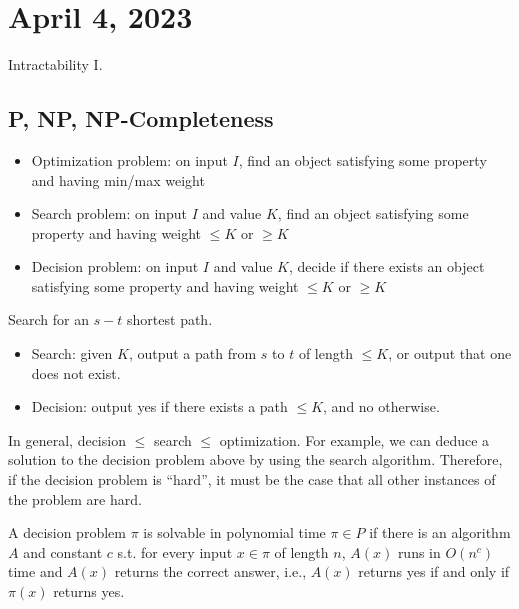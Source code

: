 \section{April 4, 2023}

Intractability I. 

\subsection{P, NP, NP-Completeness}


\begin{itemize}
    \item Optimization problem: on input $I$, find an object satisfying some property and having min/max weight
    \item Search problem: on input $I$ and value $K$, find an object satisfying some property and having weight $\leq K$ or $\geq K$
    \item Decision problem: on input $I$ and value $K$, decide if there exists an object satisfying some property and having weight $\leq K$ or $\geq K$
\end{itemize}

\begin{example}
\exlabel

Search for an $s-t$ shortest path.
\end{example}

\begin{itemize}
    \item Search: given $K$, output a path from $s$ to $t$ of length $\leq K$, or output that one does not exist. 
    \item Decision: output yes if there exists a path $\leq K$, and no otherwise. 
\end{itemize}

In general, decision $\leq$ search $\leq$ optimization. For example, we can deduce a solution to the decision problem above by using the search algorithm. Therefore, if the decision problem is ``hard'', it must be the case that all other instances of the problem are hard.  

\begin{definition}

A decision problem $\pi$ is solvable in polynomial time $\pi\in P$ if there is an algorithm $A$ and constant $c$ s.t. for every input $x\in \pi$ of length $n$, $A(x)$ runs in $O(n^c)$ time and $A(x)$ returns the correct answer, i.e., $A(x)$ returns yes if and only if $\pi(x)$ returns yes. 
\end{definition}

